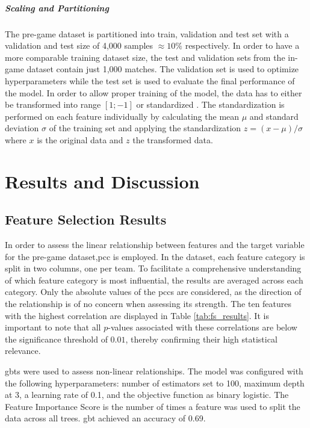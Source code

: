 \documentclass[12pt, a4paper, headinclude, twoside, plainheadsepline, open=right, numbers=noenddot, hidelinks, toc=listof, toc=bibliography]{scrreprt}
\begin{document}
\paragraph{Scaling and Partitioning}
The pre-game dataset is partitioned into train, validation and test set with a validation and test size of 4,000 samples $ \approx 10\%$ respectively.
In order to have a more comparable training dataset size, the test and validation sets from the in-game dataset contain just 1,000 matches.
The validation set is used to optimize hyperparameters while the test set is used to evaluate the final performance of the model.
In order to allow proper training of the model, the data has to either be transformed into range $[1;-1]$ or standardized \cite{shankerEffectDataStandardization1996}.
The standardization is performed on each feature individually by calculating the mean $\mu$ and standard deviation $\sigma$ of the training set and applying the standardization $z = (x - \mu) / \sigma$ where $x$ is the original data and $z$ the transformed data.

\chapter{Results and Discussion}
\label{chap:results}

\section{Feature Selection Results}
\label{sec:feature_selection_results}

In order to assess the linear relationship between features and the target variable for the pre-game dataset,\acl{pcc} is employed.
In the dataset, each feature category is split in two columns, one per team.
To facilitate a comprehensive understanding of which feature category is most influential, the results are averaged across each category.
Only the absolute values of the \acp{pcc} are considered, as the direction of the relationship is of no concern when assessing its strength.
The ten features with the highest correlation are displayed in Table \ref{tab:fs_results}.
It is important to note that all $p$-values associated with these correlations are below the significance threshold of $0.01$, thereby confirming their high statistical relevance.

\Aclp{gbt} were used to assess non-linear relationships.
The model was configured with the following hyperparameters: number of estimators set to 100, maximum depth at 3, a learning rate of 0.1, and the objective function as binary logistic.
The Feature Importance Score is the number of times a feature was used to split the data across all trees.
\Ac{gbt} achieved an accuracy of 0.69.
\end{document}
